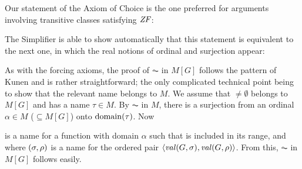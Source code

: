 Our statement of the Axiom of Choice is the one preferred for
arguments involving transitive classes satisfying $\mathit{ZF}$:
%
\begin{center}
\end{center}
%
The Simplifier is able to show automatically that this
statement is equivalent to the next one, in which the real notions of
ordinal and surjection appear:
%
\begin{center}
\end{center}

As with the forcing axioms, the proof of $\AC$ in $M[G]$ follows the pattern of Kunen
\cite[IV.2.27]{kunen2011set} and is rather
straightforward; the only complicated technical point being to show
that the relevant name belongs to $M$. We assume that ${}\neq\emptyset$
belongs to $M[G]$ and has a name $\tau\in M$. By $\AC$ in $M$, there
is a surjection  from an ordinal $\alpha\in M$ ($\subseteq M[G]$) onto
$\operatorname{domain}(\tau)$. Now
%
\begin{center}
\end{center}
%
is a name for a function  with domain $\alpha$ such that 
is included in its range, and where
$(\sigma,\rho)$ is a name for the
ordered pair $\langle\operatorname{\mathit{val}}(G,\sigma),\operatorname{\mathit{val}}(G,\rho)\rangle$. From this, $\AC$ in
$M[G]$ follows easily.

